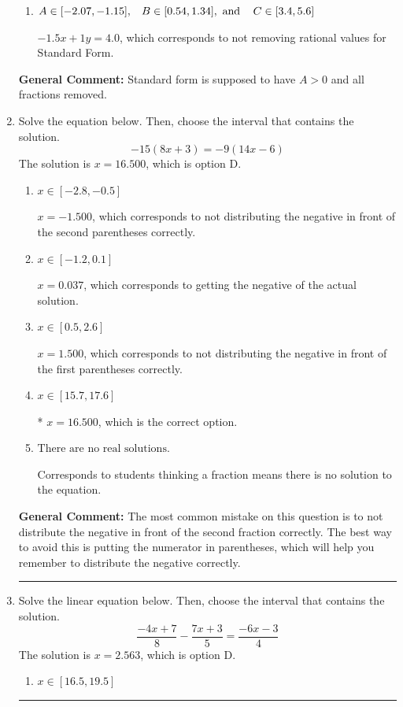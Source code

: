 \documentclass{extbook}[14pt]
\newcommand{\litem}[1]{\item #1

\rule{\textwidth}{0.4pt}}
\begin{document}
\begin{enumerate}
{\begin{enumerate}[label=\Alph*.]
* $3x - 2y = -8$, which is the correct option.
\item \( A \in [-2.07, -1.15], \hspace{3mm} B \in [0.54, 1.34], \text{ and } \hspace{3mm} C \in [3.4, 5.6] \)

 $-1.5x + 1y = 4.0$, which corresponds to not removing rational values for Standard Form.
\end{enumerate}

\textbf{General Comment:} Standard form is supposed to have $A > 0$ and all fractions removed.
}
\litem{
Solve the equation below. Then, choose the interval that contains the solution.
\[ -15(8x + 3) = -9(14x -6) \]The solution is \( x = 16.500 \), which is option D.\begin{enumerate}[label=\Alph*.]
\item \( x \in [-2.8, -0.5] \)

$x = -1.500$, which corresponds to not distributing the negative in front of the second parentheses correctly.
\item \( x \in [-1.2, 0.1] \)

$x = 0.037$, which corresponds to getting the negative of the actual solution.
\item \( x \in [0.5, 2.6] \)

$x = 1.500$, which corresponds to not distributing the negative in front of the first parentheses correctly.
\item \( x \in [15.7, 17.6] \)

* $x = 16.500$, which is the correct option.
\item \( \text{There are no real solutions.} \)

Corresponds to students thinking a fraction means there is no solution to the equation.
\end{enumerate}

\textbf{General Comment:} The most common mistake on this question is to not distribute the negative in front of the second fraction correctly. The best way to avoid this is putting the numerator in parentheses, which will help you remember to distribute the negative correctly.
}
\litem{
Solve the linear equation below. Then, choose the interval that contains the solution.
\[ \frac{-4x + 7}{8} - \frac{7x + 3}{5} = \frac{-6x -3}{4} \]The solution is \( x = 2.563 \), which is option D.\begin{enumerate}[label=\Alph*.]
\item \( x \in [16.5, 19.5] \)


\end{enumerate}}
\end{enumerate}
\end{document}
